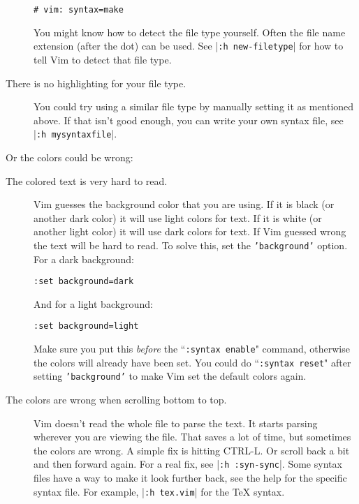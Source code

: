 \begin{description}
								\begin{Verbatim}[samepage=true]
		 # vim: syntax=make

								\end{Verbatim}

								You might know how to detect the file type yourself.
								Often the file name extension (after the dot) can be used.
								See |\texttt{:h new-filetype}| for how to tell Vim to detect that file type.

				\item [There is no highlighting for your file type.]
								You could try using a similar file type by manually setting it as mentioned above.
								If that isn't good enough, you can write your own syntax file, see |\texttt{:h mysyntaxfile}|.
\end{description}

Or the colors could be wrong:

\begin{description}
				\item [The colored text is very hard to read.]
								Vim guesses the background color that you are using.  If it is black
								(or another dark color) it will use light colors for text.  If it is
								white (or another light color) it will use dark colors for text.  If
								Vim guessed wrong the text will be hard to read.  To solve this, set
								the \texttt{'background'} option.  For a dark background:

								\begin{Verbatim}[samepage=true]
		 :set background=dark
												\end{Verbatim}

								And for a light background:

								\begin{Verbatim}[samepage=true]
		 :set background=light
												\end{Verbatim}

								Make sure you put this \emph{before} the ``\texttt{:syntax enable}" command, otherwise the colors will already have been set.
								You could do ``\texttt{:syntax reset}" after setting \texttt{'background'} to make Vim set the default colors again.

				\item [The colors are wrong when scrolling bottom to top.]
								Vim doesn't read the whole file to parse the text.
								It starts parsing wherever you are viewing the file.
								That saves a lot of time, but sometimes the colors are wrong.
								A simple fix is hitting CTRL-L.
								Or scroll back a bit and then forward again.
								For a real fix, see |\texttt{:h :syn-sync}|.
								Some syntax files have a way to make it look further back, see the help for the specific syntax file.
								For example, |\texttt{:h tex.vim}| for the TeX syntax.
\end{description}

